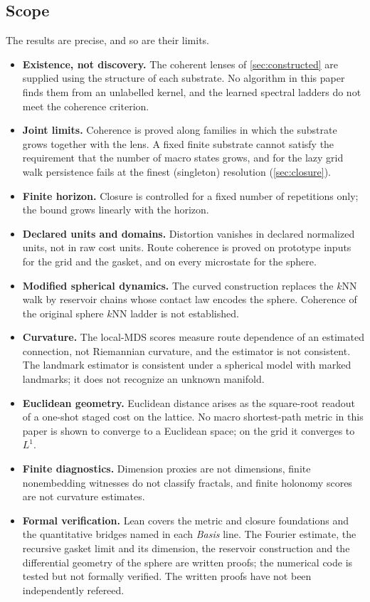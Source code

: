 \subsection{Scope}

The results are precise, and so are their limits.
\begin{itemize}[leftmargin=*]
\item \textbf{Existence, not discovery.} The coherent lenses of \cref{sec:constructed} are supplied using the structure of each substrate. No algorithm in this paper finds them from an unlabelled kernel, and the learned spectral ladders do not meet the coherence criterion.
\item \textbf{Joint limits.} Coherence is proved along families in which the substrate grows together with the lens. A fixed finite substrate cannot satisfy the requirement that the number of macro states grows, and for the lazy grid walk persistence fails at the finest (singleton) resolution (\cref{sec:closure}).
\item \textbf{Finite horizon.} Closure is controlled for a fixed number of repetitions only; the bound grows linearly with the horizon.
\item \textbf{Declared units and domains.} Distortion vanishes in declared normalized units, not in raw cost units. Route coherence is proved on prototype inputs for the grid and the gasket, and on every microstate for the sphere.
\item \textbf{Modified spherical dynamics.} The curved construction replaces the $k$NN walk by reservoir chains whose contact law encodes the sphere. Coherence of the original sphere $k$NN ladder is not established.
\item \textbf{Curvature.} The local-MDS scores measure route dependence of an estimated connection, not Riemannian curvature, and the estimator is not consistent. The landmark estimator is consistent under a spherical model with marked landmarks; it does not recognize an unknown manifold.
\item \textbf{Euclidean geometry.} Euclidean distance arises as the square-root readout of a one-shot staged cost on the lattice. No macro shortest-path metric in this paper is shown to converge to a Euclidean space; on the grid it converges to $L^1$.
\item \textbf{Finite diagnostics.} Dimension proxies are not dimensions, finite nonembedding witnesses do not classify fractals, and finite holonomy scores are not curvature estimates.
\item \textbf{Formal verification.} Lean covers the metric and closure foundations and the quantitative bridges named in each \emph{Basis} line. The Fourier estimate, the recursive gasket limit and its dimension, the reservoir construction and the differential geometry of the sphere are written proofs; the numerical code is tested but not formally verified. The written proofs have not been independently refereed.
\end{itemize}
